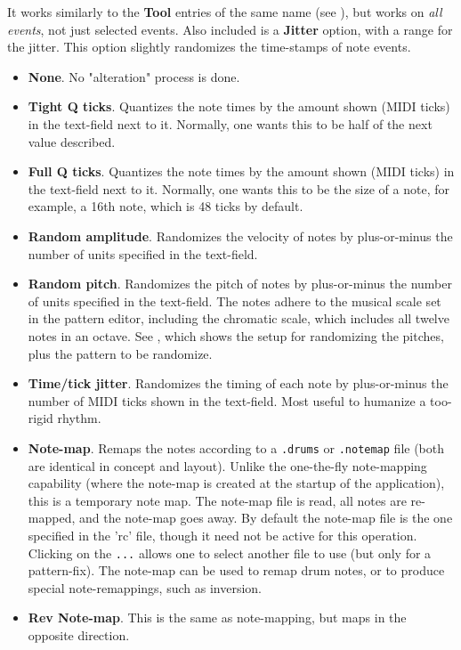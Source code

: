    It works similarly to the \textbf{Tool} entries of the
   same name (see ),
   but works on \textsl{all events}, not just selected events.
   Also included is a \textbf{Jitter} option, with a range for the jitter.
   This option slightly randomizes the time-stamps of note events.

   \begin{itemize}
      \item \textbf{None}.
      No "alteration" process is done.
      \item \textbf{Tight Q ticks}.
         Quantizes the note times by the amount shown (MIDI ticks)
         in the text-field next to it. Normally, one wants this to be
         half of the next value described.
      \item \textbf{Full Q ticks}.
         Quantizes the note times by the amount shown (MIDI ticks)
         in the text-field next to it. Normally, one wants this to be
         the size of a note, for example, a 16th note, which is 48
         ticks by default.
      \item \textbf{Random amplitude}.
         Randomizes the velocity of notes by plus-or-minus the number of units
         specified in the text-field.
      \item \textbf{Random pitch}.
         Randomizes the pitch of notes by plus-or-minus the number of units
         specified in the text-field.
         The notes adhere to the musical scale set in the pattern
         editor, including the chromatic scale, which includes all twelve
         notes in an octave.
         See , which shows
         the setup for randomizing the pitches, plus the pattern to be
         randomize.
      \item \textbf{Time/tick jitter}.
         Randomizes the timing of each note by plus-or-minus the number of
         MIDI ticks shown in the text-field.
         Most useful to humanize a too-rigid rhythm.
      \item \textbf{Note-map}.
         Remaps the notes according to a 
         \texttt{.drums} or \texttt{.notemap} file (both are
         identical in concept and layout).
         Unlike the one-the-fly note-mapping capability (where the
         note-map is created at the startup of the application),
         this is a temporary note map.
         The note-map file is read, all notes are re-mapped, and the
         note-map goes away.
         By default the note-map file is the one specified in the 'rc' file,
         though it need not be active for this operation.
         Clicking on the \texttt{...} allows one to select another file to
         use (but only for a pattern-fix).
         The note-map can be used to remap drum notes, or to produce
         special note-remappings, such as inversion.
      \item \textbf{Rev Note-map}.
         This is the same as note-mapping, but maps in the opposite direction.
   \end{itemize}

